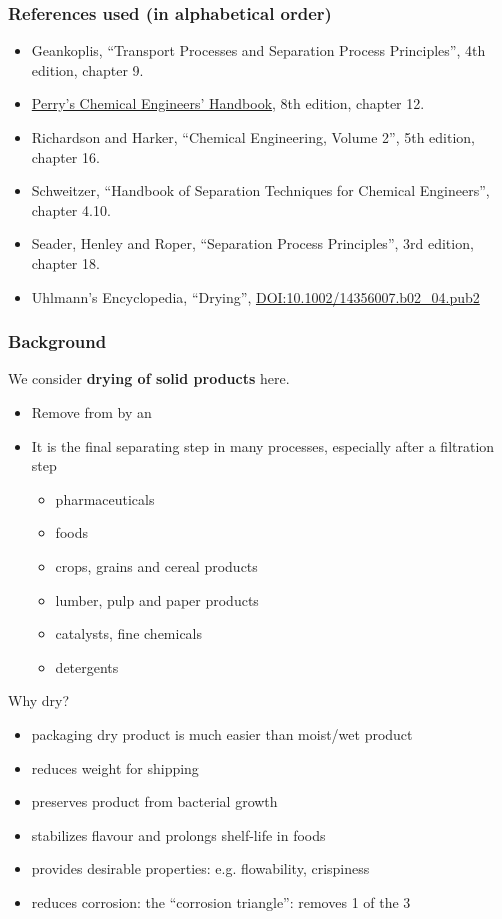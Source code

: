 \begin{frame}\frametitle{References used (in alphabetical order)}
	\begin{itemize}
		\item	Geankoplis, ``Transport Processes and Separation Process Principles'', 4th edition, chapter 9.
		\item	\href{http://accessengineeringlibrary.com/browse/perrys-chemical-engineers-handbook-eighth-edition}{Perry's Chemical Engineers' Handbook}, 8th edition, chapter 12.
		\item	Richardson and Harker, ``Chemical Engineering, Volume 2'', 5th edition, chapter 16.
		\item	Schweitzer, ``Handbook of Separation Techniques for Chemical Engineers'', chapter 4.10.
		\item	Seader, Henley and Roper, ``Separation Process Principles'', 3rd edition, chapter 18.
		\item	Uhlmann's Encyclopedia, ``Drying'', {\tiny \href{http://dx.doi.org/10.1002/14356007.b02\_04.pub2}{DOI:10.1002/14356007.b02\_04.pub2}}
	\end{itemize}
\end{frame}

\begin{frame}\frametitle{Background}
	We consider \textbf{drying of solid products} here.
	\begin{itemize}
		\item	Remove {\color{myOrange}{liquid phase}} from {\color{myOrange}{solid phase}} by an {\color{myOrange}{ESA = thermal energy}}
		\item	It is the final separating step in many processes, especially after a filtration step
		\begin{itemize}
			\item	pharmaceuticals %
			\item	foods %
			\item	crops, grains and cereal products %
			\item	lumber, pulp and paper products %
			\item	catalysts, fine chemicals  %
			\item	detergents
		\end{itemize}
	\end{itemize}
	Why dry?
	\begin{itemize}
		\item	packaging dry product is much easier than moist/wet product
		\item	reduces weight for shipping
		\item	preserves product from bacterial growth
		\item	stabilizes flavour and prolongs shelf-life in foods
		\item	provides desirable properties: e.g. flowability, crispiness
		\item	reduces corrosion: the ``corrosion triangle'': removes 1 of the 3 %
	\end{itemize}
\end{frame}

